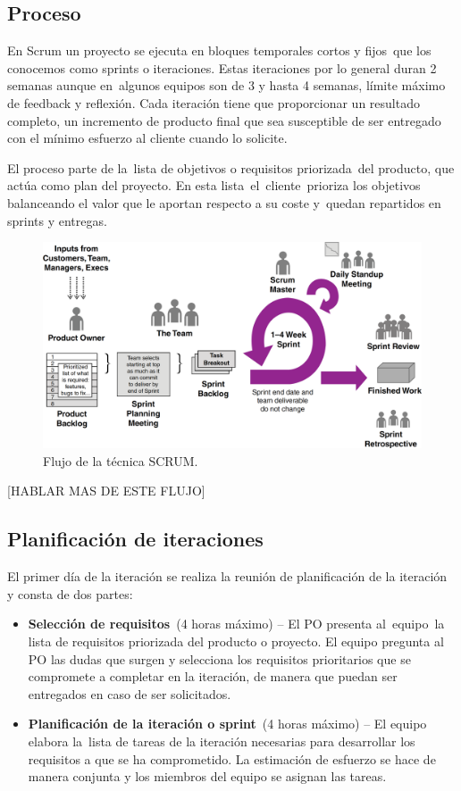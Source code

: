 \subsection{Proceso}
En Scrum un proyecto se ejecuta en bloques temporales cortos y fijos que los conocemos como sprints o iteraciones. Estas iteraciones por lo general duran 2 semanas aunque en algunos equipos son de 3 y hasta 4 semanas, límite máximo de feedback y reflexión\citep{davis_agile_2015}. Cada iteración tiene que proporcionar un resultado completo, un incremento de producto final que sea susceptible de ser entregado con el mínimo esfuerzo al cliente cuando lo solicite.

El proceso parte de la lista de objetivos o requisitos priorizada del producto, que actúa como plan del proyecto. En esta lista el cliente prioriza los objetivos balanceando el valor que le aportan respecto a su coste y quedan repartidos en sprints y entregas.

\begin{figure}[H]
\centering
\includegraphics[width=125mm,scale=1]{Figuras/flujo_scrum}
\caption{Flujo de la técnica SCRUM.}
  \label{flujo_scrum}
\end{figure}

[HABLAR MAS DE ESTE FLUJO]

\subsection{Planificación de iteraciones}
El primer día de la iteración se realiza la reunión de planificación de la iteración y consta de dos partes:
\begin{itemize}
    \item \textbf{Selección de requisitos} (4 horas máximo) – El PO presenta al equipo la lista de requisitos priorizada del producto o proyecto. El equipo pregunta al PO las dudas que surgen y selecciona los requisitos prioritarios que se compromete a completar en la iteración, de manera que puedan ser entregados en caso de ser solicitados.
    \item \textbf{Planificación de la iteración o sprint} (4 horas máximo) – El equipo elabora la lista de tareas de la iteración necesarias para desarrollar los requisitos a que se ha comprometido. La estimación de esfuerzo se hace de manera conjunta y los miembros del equipo se asignan las tareas.
\end{itemize}

